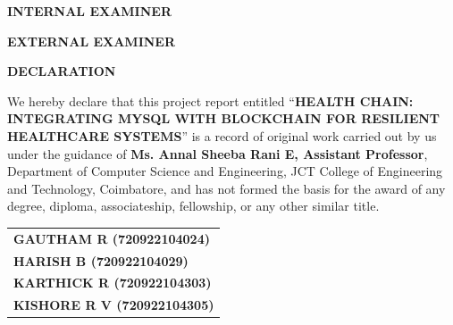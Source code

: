 \documentclass[12pt,a4paper]{report}
\begin{document}
\begin{titlepage}
\vspace{0.9cm}
\begin{center}
\begin{minipage}{0.96\textwidth}
\begin{minipage}[t]{0.47\textwidth}
\textbf{INTERNAL EXAMINER}
\end{minipage}
\hfill
\begin{minipage}[t]{0.47\textwidth}
\textbf{EXTERNAL EXAMINER}
\end{minipage}
\end{minipage}
\end{center}

\vspace*{\fill}
\end{titlepage}

\begin{titlepage}
\thispagestyle{empty}
\begin{center}
{\fontsize{16}{24}\selectfont\textbf{DECLARATION}}\\[1.0cm]
\end{center}

\begin{minipage}{0.92\textwidth}
\setlength{\parindent}{0pt}
We hereby declare that this project report entitled
``\textbf{HEALTH CHAIN: INTEGRATING MYSQL WITH BLOCKCHAIN FOR RESILIENT HEALTHCARE SYSTEMS}''
is a record of original work carried out by us under the guidance of
\textbf{Ms. Annal Sheeba Rani E, Assistant Professor}, Department of Computer Science and Engineering,
JCT College of Engineering and Technology, Coimbatore, and has not formed the basis for the award
of any degree, diploma, associateship, fellowship, or any other similar title.
\end{minipage}

\vspace{1.2cm}

\begin{flushright}
\begin{tabular}{l}
\textbf{GAUTHAM R (720922104024)} \\
\textbf{HARISH B (720922104029)} \\
\textbf{KARTHICK R (720922104303)} \\
\textbf{KISHORE R V (720922104305)}
\end{tabular}
\end{flushright}

\vfill
\end{titlepage}
\end{document}
